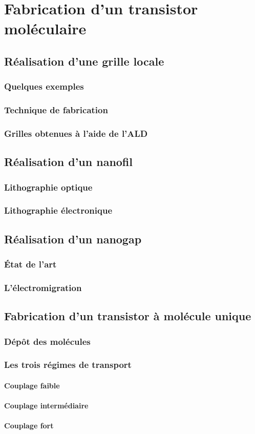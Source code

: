\chapter{Fabrication d'un transistor moléculaire}

\section{Réalisation d'une grille locale}
\subsection{Quelques exemples}
\subsection{Technique de fabrication}
\subsection{Grilles obtenues à l'aide de l'ALD}


\section{Réalisation d'un nanofil}
\subsection{Lithographie optique}
\subsection{Lithographie électronique}

\section{Réalisation d'un nanogap}
\subsection{État de l'art}
\subsection{L'électromigration}

\section{Fabrication d'un transistor à molécule unique}
\subsection{Dép\^ot des molécules}
\subsection{Les trois régimes de transport}
\subsubsection{Couplage faible}
\subsubsection{Couplage intermédiaire}
\subsubsection{Couplage fort}